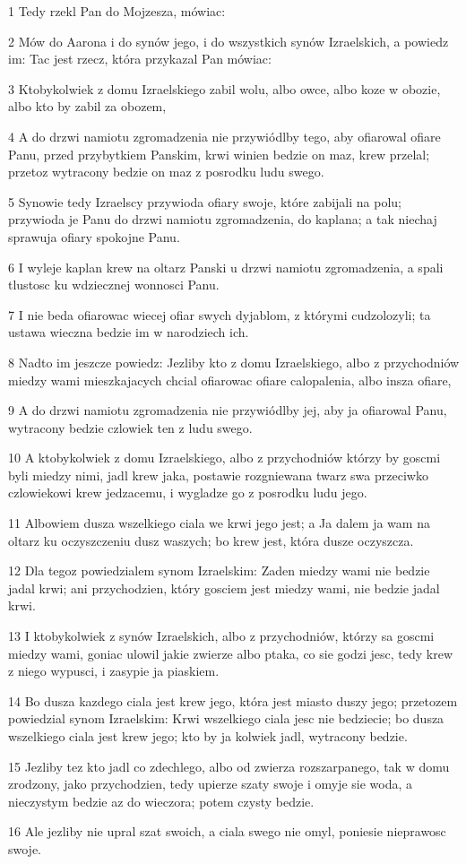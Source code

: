 \par 1 Tedy rzekl Pan do Mojzesza, mówiac:
\par 2 Mów do Aarona i do synów jego, i do wszystkich synów Izraelskich, a powiedz im: Tac jest rzecz, która przykazal Pan mówiac:
\par 3 Ktobykolwiek z domu Izraelskiego zabil wolu, albo owce, albo koze w obozie, albo kto by zabil za obozem,
\par 4 A do drzwi namiotu zgromadzenia nie przywiódlby tego, aby ofiarowal ofiare Panu, przed przybytkiem Panskim, krwi winien bedzie on maz, krew przelal; przetoz wytracony bedzie on maz z posrodku ludu swego.
\par 5 Synowie tedy Izraelscy przywioda ofiary swoje, które zabijali na polu; przywioda je Panu do drzwi namiotu zgromadzenia, do kaplana; a tak niechaj sprawuja ofiary spokojne Panu.
\par 6 I wyleje kaplan krew na oltarz Panski u drzwi namiotu zgromadzenia, a spali tlustosc ku wdziecznej wonnosci Panu.
\par 7 I nie beda ofiarowac wiecej ofiar swych dyjablom, z którymi cudzolozyli; ta ustawa wieczna bedzie im w narodziech ich.
\par 8 Nadto im jeszcze powiedz: Jezliby kto z domu Izraelskiego, albo z przychodniów miedzy wami mieszkajacych chcial ofiarowac ofiare calopalenia, albo insza ofiare,
\par 9 A do drzwi namiotu zgromadzenia nie przywiódlby jej, aby ja ofiarowal Panu, wytracony bedzie czlowiek ten z ludu swego.
\par 10 A ktobykolwiek z domu Izraelskiego, albo z przychodniów którzy by goscmi byli miedzy nimi, jadl krew jaka, postawie rozgniewana twarz swa przeciwko czlowiekowi krew jedzacemu, i wygladze go z posrodku ludu jego.
\par 11 Albowiem dusza wszelkiego ciala we krwi jego jest; a Ja dalem ja wam na oltarz ku oczyszczeniu dusz waszych; bo krew jest, która dusze oczyszcza.
\par 12 Dla tegoz powiedzialem synom Izraelskim: Zaden miedzy wami nie bedzie jadal krwi; ani przychodzien, który gosciem jest miedzy wami, nie bedzie jadal krwi.
\par 13 I ktobykolwiek z synów Izraelskich, albo z przychodniów, którzy sa goscmi miedzy wami, goniac ulowil jakie zwierze albo ptaka, co sie godzi jesc, tedy krew z niego wypusci, i zasypie ja piaskiem.
\par 14 Bo dusza kazdego ciala jest krew jego, która jest miasto duszy jego; przetozem powiedzial synom Izraelskim: Krwi wszelkiego ciala jesc nie bedziecie; bo dusza wszelkiego ciala jest krew jego; kto by ja kolwiek jadl, wytracony bedzie.
\par 15 Jezliby tez kto jadl co zdechlego, albo od zwierza rozszarpanego, tak w domu zrodzony, jako przychodzien, tedy upierze szaty swoje i omyje sie woda, a nieczystym bedzie az do wieczora; potem czysty bedzie.
\par 16 Ale jezliby nie upral szat swoich, a ciala swego nie omyl, poniesie nieprawosc swoje.

